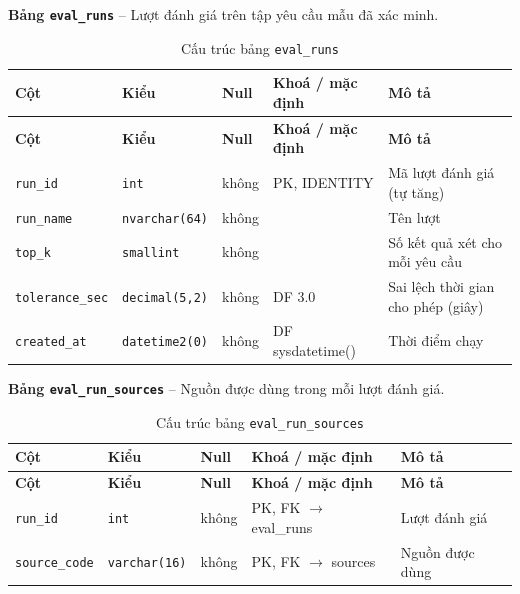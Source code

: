 \textbf{Bảng \texttt{eval\_runs}} -- Lượt đánh giá trên tập yêu cầu mẫu đã xác minh.

\setlength{\tabcolsep}{4pt}
\begin{longtable}{>{\raggedright\arraybackslash}p{}>{\raggedright\arraybackslash}p{}>{\centering\arraybackslash}p{}>{\raggedright\arraybackslash}p{}>{\raggedright\arraybackslash}p{}}
\caption{Cấu trúc bảng \texttt{eval\_runs}}\label{tab:col_eval_runs}\\
\toprule \textbf{Cột} & \textbf{Kiểu} & \textbf{Null} & \textbf{Khoá / mặc định} & \textbf{Mô tả} \\ \midrule \endfirsthead
\toprule \textbf{Cột} & \textbf{Kiểu} & \textbf{Null} & \textbf{Khoá / mặc định} & \textbf{Mô tả} \\ \midrule \endhead
\bottomrule \endfoot
\texttt{run\_id} & {\footnotesize\texttt{int}} & không & PK, IDENTITY & Mã lượt đánh giá (tự tăng) \\
\texttt{run\_name} & {\footnotesize\texttt{nvarchar(64)}} & không &  & Tên lượt \\
\texttt{top\_k} & {\footnotesize\texttt{smallint}} & không &  & Số kết quả xét cho mỗi yêu cầu \\
\texttt{tolerance\_sec} & {\footnotesize\texttt{decimal(5,2)}} & không & DF 3.0 & Sai lệch thời gian cho phép (giây) \\
\texttt{created\_at} & {\footnotesize\texttt{datetime2(0)}} & không & DF sysdatetime() & Thời điểm chạy \\
\end{longtable}

\textbf{Bảng \texttt{eval\_run\_sources}} -- Nguồn được dùng trong mỗi lượt đánh giá.

\setlength{\tabcolsep}{4pt}
\begin{longtable}{>{\raggedright\arraybackslash}p{}>{\raggedright\arraybackslash}p{}>{\centering\arraybackslash}p{}>{\raggedright\arraybackslash}p{}>{\raggedright\arraybackslash}p{}}
\caption{Cấu trúc bảng \texttt{eval\_run\_sources}}\label{tab:col_eval_run_sources}\\
\toprule \textbf{Cột} & \textbf{Kiểu} & \textbf{Null} & \textbf{Khoá / mặc định} & \textbf{Mô tả} \\ \midrule \endfirsthead
\toprule \textbf{Cột} & \textbf{Kiểu} & \textbf{Null} & \textbf{Khoá / mặc định} & \textbf{Mô tả} \\ \midrule \endhead
\bottomrule \endfoot
\texttt{run\_id} & {\footnotesize\texttt{int}} & không & PK, FK $\rightarrow$ eval\_runs & Lượt đánh giá \\
\texttt{source\_code} & {\footnotesize\texttt{varchar(16)}} & không & PK, FK $\rightarrow$ sources & Nguồn được dùng \\
\end{longtable}

